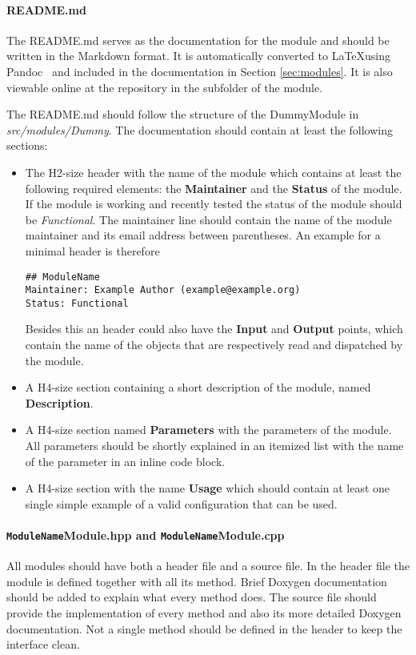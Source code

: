\paragraph{README.md}
The README.md serves as the documentation for the module and should be written in the Markdown format. It is automatically converted to \LaTeX using Pandoc~\cite{pandoc} and included in the documentation in Section \ref{sec:modules}. It is also viewable online at the repository in the subfolder of the module. 

The README.md should follow the structure of the DummyModule in \textit{src/modules/Dummy}. The documentation should contain at least the following sections:
\begin{itemize}
\item The H2-size header with the name of the module which contains at least the following required elements: the \textbf{Maintainer} and the \textbf{Status} of the module. If the module is working and recently tested the status of the module should be \textit{Functional}. The maintainer line should contain the name of the module maintainer and its email address between parentheses. An example for a minimal header is therefore
\begin{verbatim}
## ModuleName
Maintainer: Example Author (example@example.org)
Status: Functional
\end{verbatim}
Besides this an header could also have the \textbf{Input} and \textbf{Output} points, which contain the name of the objects that are respectively read and dispatched by the module.
\item A H4-size section containing a short description of the module, named \textbf{Description}. 
\item A H4-size section named \textbf{Parameters} with the parameters of the module. All parameters should be shortly explained in an itemized list with the name of the parameter in an inline code block.
\item A H4-size section with the name \textbf{Usage} which should contain at least one single simple example of a valid configuration that can be used.
\end{itemize}

\paragraph{\texttt{ModuleName}Module.hpp and \texttt{ModuleName}Module.cpp}
All modules should have both a header file and a source file. In the header file the module is defined together with all its method. Brief Doxygen documentation should be added to explain what every method does. The source file should provide the implementation of every method and also its more detailed Doxygen documentation. Not a single method should be defined in the header to keep the interface clean.

